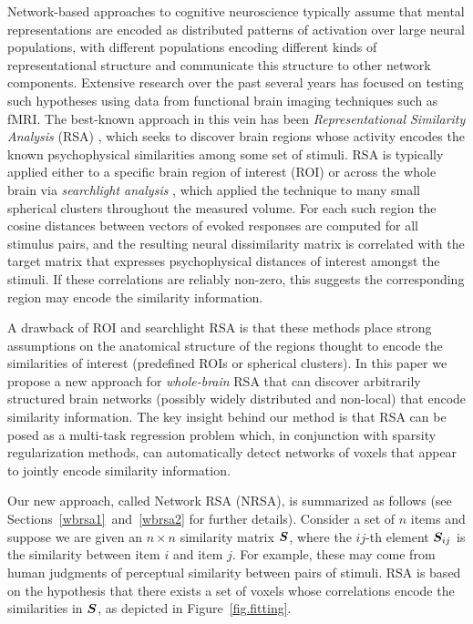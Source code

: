 Network-based approaches to cognitive neuroscience typically assume that mental
representations are encoded as distributed patterns of activation over large neural
populations, with different populations encoding different kinds of representational
structure and communicate this structure to other network components. Extensive research over the past several years has focused on testing such hypotheses using data from functional brain imaging techniques such as fMRI. The best-known approach in this vein has been \emph{Representational Similarity Analysis} (RSA) \cite{RSA}, which seeks to discover brain regions whose activity encodes the known psychophysical similarities among some set of stimuli. RSA is typically applied either to a specific brain region of interest (ROI) or across the whole brain via {\em searchlight analysis} \cite{searchlight}, which applied the technique to many small spherical clusters throughout the measured volume. For each such region the cosine distances between vectors of evoked responses are computed for all stimulus pairs, and the resulting neural dissimilarity matrix is correlated with the target matrix that expresses psychophysical distances of interest amongst the stimuli. If these correlations are reliably non-zero, this suggests the corresponding region may encode the similarity information.

A drawback of ROI and searchlight RSA is that these methods place strong assumptions on the anatomical structure of the regions thought to encode the similarities of interest (predefined ROIs or spherical clusters). In this paper we propose a new approach for {\em whole-brain} RSA that can discover arbitrarily structured brain networks (possibly widely
distributed and non-local) that encode similarity information. The key insight behind our method is that RSA can be posed as a multi-task regression problem which, in conjunction with sparsity regularization methods, can automatically detect networks of voxels that appear to jointly encode similarity information.

Our new approach, called Network RSA (NRSA), is summarized as follows (see Sections~\ref{wbrsa1}~and~\ref{wbrsa2} for further details).  Consider a set of $n$ items and suppose we are given an $n \times n$ similarity matrix $\boldsymbol{S}$, where the $ij$-th element $\boldsymbol{S}_{ij}$ is the similarity\cite{similarity} between item $i$ and item $j$. For example, these may come from human judgments of perceptual similarity between pairs of stimuli.  RSA is based on the hypothesis that there exists a set of voxels whose correlations encode the similarities in $\boldsymbol{S}$, as depicted in Figure~\ref{fig.fitting}.



